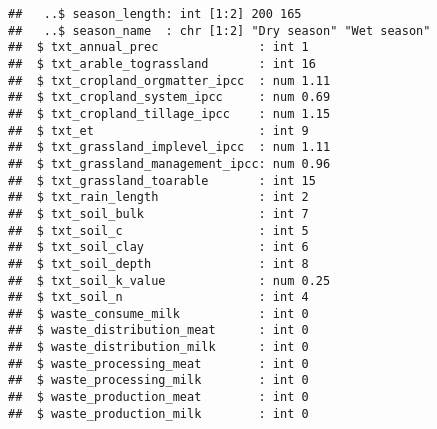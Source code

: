 \documentclass[
]{article}
\begin{document}
\begin{verbatim}
##   ..$ season_length: int [1:2] 200 165
##   ..$ season_name  : chr [1:2] "Dry season" "Wet season"
##  $ txt_annual_prec              : int 1
##  $ txt_arable_tograssland       : int 16
##  $ txt_cropland_orgmatter_ipcc  : num 1.11
##  $ txt_cropland_system_ipcc     : num 0.69
##  $ txt_cropland_tillage_ipcc    : num 1.15
##  $ txt_et                       : int 9
##  $ txt_grassland_implevel_ipcc  : num 1.11
##  $ txt_grassland_management_ipcc: num 0.96
##  $ txt_grassland_toarable       : int 15
##  $ txt_rain_length              : int 2
##  $ txt_soil_bulk                : int 7
##  $ txt_soil_c                   : int 5
##  $ txt_soil_clay                : int 6
##  $ txt_soil_depth               : int 8
##  $ txt_soil_k_value             : num 0.25
##  $ txt_soil_n                   : int 4
##  $ waste_consume_milk           : int 0
##  $ waste_distribution_meat      : int 0
##  $ waste_distribution_milk      : int 0
##  $ waste_processing_meat        : int 0
##  $ waste_processing_milk        : int 0
##  $ waste_production_meat        : int 0
##  $ waste_production_milk        : int 0
\end{verbatim}
\end{document}
